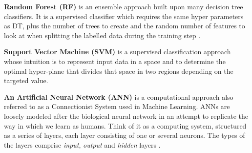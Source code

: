 \textbf{Random Forest (RF)} \cite{Be01} is an ensemble approach built upon many decision tree classifiers. It is a supervised classifier which requires the same hyper parameters as DT, plus the number of trees to create and the random number of features
to look at when splitting the labelled data during the training step \cite{Be01}. 
 
\textbf{Support Vector Machine (SVM)} \cite{Ev01} is a supervised classification approach whose intuition is to represent input data in a space and to determine the optimal hyper-plane that divides that space in two regions depending on the targeted value.


\textbf{An Artificial Neural Network (ANN)} \cite{Me19} is a computational approach also referred to as a Connectionist System used in Machine Learning. ANNs are loosely modeled after the biological neural network in an attempt to replicate the way in which we learn as humans. Think of it as a computing system, structured as a series of layers, each layer consisting of one or several neurons. The types of the layers comprise \emph{input}, \emph{output} and \emph{hidden} layers \cite{anderson1972simple,raschka2015python}.


